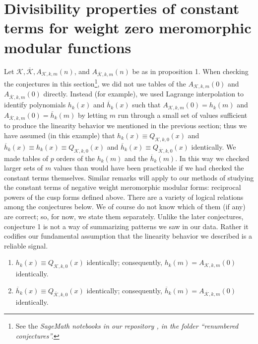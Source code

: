 \documentclass{article}
\begin{document}
\section{Divisibility properties of constant terms
for weight zero meromorphic modular functions}
Let $\mathcal{K}, \overline{\mathcal{K}},
A_{\mathcal{K},k,m}(n)$,
and 
$A_{\overline{\mathcal{K}},k,m}(n)$ 
be as in proposition 1.
 When checking the conjectures in this 
 section\footnote{
See the \it SageMath \rm notebooks
in our repository
\cite{githubNewmanShanks},
in the folder ``renumbered conjectures''.
}, we did not
use  tables of the
$A_{\mathcal{K},k,m}(0)$ 
and $A_{\overline{\mathcal{K}},k,m}(0)$
directly.
Instead (for example), we used 
Lagrange interpolation
to identify polynomials $h_k(x)$
and $\overline{h}_k(x)$
such that $A_{\mathcal{K},k,m}(0) = h_k(m)$
and
$A_{\overline{\mathcal{K}},k,m}(0) = 
\overline{h}_k(m)$
by letting $m$ run through a small set
of values sufficient to produce
the linearity behavior we mentioned
in the previous section; thus
we have assumed (in this example) that
$h_k(x) \equiv Q_{\mathcal{K},k,0}(x)$
and
$\overline{h}_k(x) \equiv 
h_k(x) \equiv Q_{\mathcal{K},k,0}(x)$
and
$\overline{h}_k(x) \equiv 
Q_{\overline{\mathcal{K}},k,0}(x)$
identically. We made tables
of $p$ orders of the 
$h_k(m)$ and the $\overline{h}_k(m)$. 
In this way we checked larger sets of $m$
values
than would have been practicable if we 
had checked
the constant terms themselves.
Similar remarks will apply to our methods of
studying the
constant terms of negative weight meromorphic
modular forms: reciprocal powers of the cusp 
forms defined above.
\newline \newline \noindent
There are a variety of logical relations
among the conjectures below. We of course
do not know which of them (if any) are correct; 
so, for now, we state them separately.
\newline \newline \noindent
Unlike the later conjectures, conjecture 1
is not a way of summarizing patterns we saw
in our data. Rather it codifies our fundamental
assumption that the linearity behavior
we described is a reliable signal.
\begin{conjecture}
\begin{enumerate}
\item 
$h_k(x) \equiv 
Q_{\mathcal{K},k,0}(x)$ identically;
consequently, 
$h_k(m) = A_{\mathcal{K},k,m}(0)$
identically.
\item
$\overline{h}_k(x) \equiv 
Q_{\overline{\mathcal{K}},k,0}(x)$
identically; consequently,
$\overline{h}_k(m) = 
A_{\overline{\mathcal{K}},k,m}(0)$
identically.
\end{enumerate}
\end{conjecture} \noindent
\end{document}
